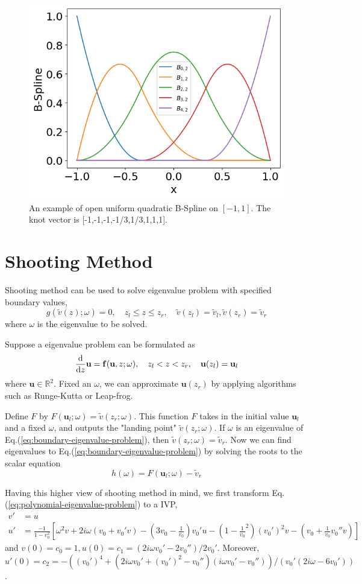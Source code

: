 \begin{figure} [H]
	\centering
	\includegraphics[width=0.7\linewidth]{img/methodology/bspline}
	\caption{An example of open uniform quadratic B-Spline on $[-1,1]$. The knot vector is [-1,-1,-1,-1/3,1/3,1,1,1].}
	\label{fig:bspline}
\end{figure}


\section{Shooting Method}
Shooting method can be used to solve eigenvalue problem with specified boundary values,
\begin{equation} \label{eq:boundary-eigenvalue-problem}
g(\tilde{v}(z);\omega) = 0,
\quad
z_l \leq z \leq z_r,
\quad
\tilde{v}(z_l) = \tilde{v}_l, \tilde{v}(z_r) = \tilde{v}_r
\end{equation}
where $\omega$ is the eigenvalue to be solved.

Suppose a eigenvalue problem can be formulated as
\[ \dv{z}\mathbf{u} = \mathbf{f}(\mathbf{u},z;\omega),
\quad
z_l<z<z_r,
\quad
\mathbf{u}(z_l) = \mathbf{u}_l
\]
where $\mathbf{u}\in\mathbb{R}^2$. Fixed an $\omega$, we can approximate $\mathbf{u}(z_r)$ by applying algorithms such as Runge-Kutta or Leap-frog.

Define $F$ by $F(\mathbf{u}_l;\omega)=\tilde{v}(z_r;\omega)$. This function $F$ takes in the initial value $\mathbf{u}_l$ and a fixed $\omega$, and outputs the "landing point" $\tilde{v}(z_r;\omega)$. If $\omega$ is an eigenvalue of Eq.(\ref{eq:boundary-eigenvalue-problem}), then $\tilde{v}(z_r;\omega) = \tilde{v}_r$. Now we can find eigenvalues to Eq.(\ref{eq:boundary-eigenvalue-problem}) by solving the roots to the scalar equation
\[h(\omega) = F(\mathbf{u}_l;\omega) - \tilde{v}_r\]

Having this higher view of shooting method in mind, we first transform Eq.(\ref{eq:polynomial-eigenvalue-problem}) to a IVP,
\begin{align*}
v' &= u\\
u' &= \frac{-1}{1-v_0^2}\left[
    \omega^2v + 2i\omega(v_0+v_0'v) - \left(3v_0 - \frac{1}{v_0}\right)v_0'u - \left(1-\frac{1}{v_0}^2\right)(v_0')^2v - \left(v_0+\frac{1}{v_0}v_0'' v\right)
\right]
\end{align*}
and $v(0)=c_0=1,u(0)=c_1=(2i\omega v_0'-2v_0'')/2v_0'$. Moreover, $u'(0)=c_2=-((v_0')^4+(2i\omega v_0' + (v_0')^2 - v_0'')(i\omega v_0' - v_0''))/(v_0'(2i\omega-6v_0'))$.

